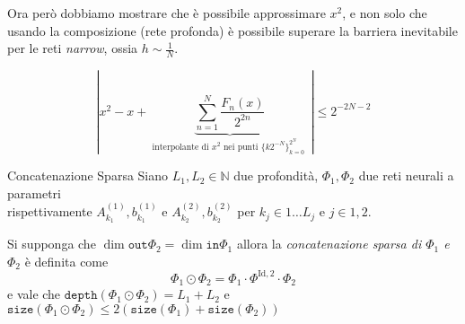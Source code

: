  Ora però dobbiamo mostrare che è possibile approssimare \(x^2\), e non solo che
 usando la composizione (rete profonda) è possibile superare la barriera inevitabile per le reti \emph{narrow}, ossia \(h \sim \frac{1}{N}\).

\begin{proposition}{}
     \[
         \left| x^2 - x + \underbrace{\sum_{n=1}^{N} \frac{F_{n}{(x)}}{2^{2n}}}_{\text{ interpolante di \(x^2\) nei punti \(\{k 2^{-N}\}_{k=0}^{2^N} \) }}   \right| \le
       2^{-2N -2}
     \]
\end{proposition}

\begin{definition}{Concatenazione Sparsa}
    Siano \(L_{1}, L_{2} \in \mathbb{N}\) due profondità, \(\Phi_{1}, \Phi_{2}\) due reti neurali a parametri \\ rispettivamente \(A_{k_{1}}^{{(1)}}, b_{k_{1}}^{{(1)}}\) e \(A_{k_{2}}^{{(2)}}, b_{k_{2}}^{{(2)}}\) per \(k_j \in 1\dots L_j\) e \(j \in 1, 2\).

    Si supponga che \(\dim \mathtt{out} \Phi_2 = \dim \mathtt{in} \Phi_{1}\)
    allora la \emph{concatenazione sparsa di \(\Phi_{1}\) e \(\Phi_{2}\)  } è
    definita come
    \[
      \Phi_{1} \odot \Phi_{2} = \Phi_{1} \cdot \Phi^{\mathrm{Id, 2}} \cdot
      \Phi_2
    \]
    e vale che \(\mathtt{depth}{(\Phi_{1} \odot \Phi_{2})} = L_{1} + L_{2}\) e
    \(\mathtt{size}{(\Phi_{1} \odot \Phi_{2})} \le  2{(\mathtt{size}{(\Phi_{1})} + \mathtt{size}{(\Phi_{2})})}\) 
\end{definition}




